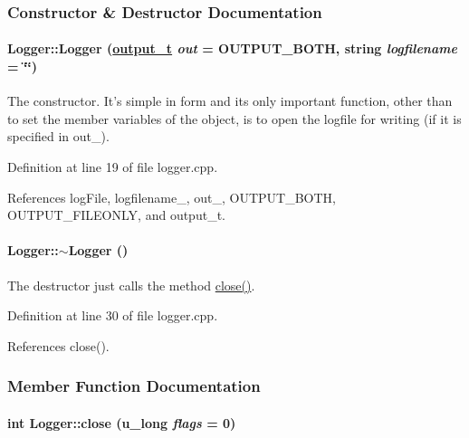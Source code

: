 \subsubsection{Constructor \& Destructor Documentation}
\hypertarget{classLogger_Loggera0}{
\paragraph[Logger]{\setlength{\rightskip}{0pt plus 5cm}Logger::Logger (\hyperlink{logger_8h_a3}{output\_\-t} {\em out} = OUTPUT\_\-BOTH, string {\em logfilename} = \char`\"{}\char`\"{})}\hfill}
\label{classLogger_Loggera0}


The constructor. It's simple in form and its only important function, other than to set the member variables of the object, is to open the logfile for writing (if it is specified in out\_\-). 

Definition at line 19 of file logger.cpp.

References log\-File, logfilename\_\-, out\_\-, OUTPUT\_\-BOTH, OUTPUT\_\-FILEONLY, and output\_\-t.\hypertarget{classLogger_Loggera1}{
\paragraph[$\sim$Logger]{\setlength{\rightskip}{0pt plus 5cm}Logger::$\sim$Logger ()}\hfill}
\label{classLogger_Loggera1}


The destructor just calls the method \hyperlink{classLogger_Loggera3}{close()}. 

Definition at line 30 of file logger.cpp.

References close().

\subsubsection{Member Function Documentation}
\hypertarget{classLogger_Loggera3}{
\paragraph[close]{\setlength{\rightskip}{0pt plus 5cm}int Logger::close (u\_\-long {\em flags} = 0)}\hfill}
\label{classLogger_Loggera3}


